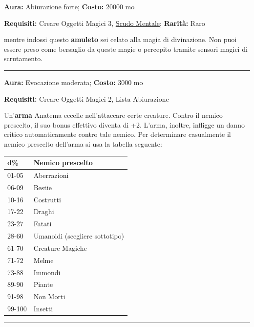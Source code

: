 \begin{multicols}{2}
\textbf{Aura:} Abiurazione forte; \textbf{Costo:} 20000 mo

\textbf{Requisiti:} Creare Oggetti Magici 3, \hyperlink{AnellodelloScudoMentale}{Scudo Mentale}; \textbf{Rarità:} Raro

mentre indossi questo \textbf{amuleto} sei celato alla magia di divinazione. Non puoi essere preso come bersaglio da queste magie o percepito tramite sensori magici di scrutamento.

\smallskip\noindent\rule{\linewidth}{2pt}  \hypertarget{armaAnatema}{}\smallskip{}\noindent\label{armaAnatema}

\textbf{Aura:} Evocazione moderata; \textbf{Costo:} 3000 mo

\textbf{Requisiti:} Creare Oggetti Magici 2, Lista Abiurazione

Un'\textbf{arma} Anatema eccelle nell'attaccare certe creature. Contro il nemico prescelto, il suo bonus effettivo diventa di +2. L'arma, inoltre, infligge un danno critico automaticamente contro tale nemico. Per determinare casualmente il nemico prescelto dell'arma si usa la tabella seguente:

\medskip

\noindent\begin{tabular}{ll}
	\toprule
d\% &Nemico prescelto\\
\toprule
01-05 &Aberrazioni\\
06-09 &Bestie\\
10-16 &Costrutti\\
17-22 &Draghi\\
23-27 &Fatati\\
28-60 &Umanoidi (scegliere sottotipo)\\
61-70 &Creature Magiche\\
71-72 &Melme\\
73-88 &Immondi\\
89-90 &Piante\\
91-98 &Non Morti\\
99-100 &Insetti
\end{tabular}

\medskip

\smallskip\noindent\rule{\linewidth}{2pt}  \hypertarget{AnelloAccumulaIncantesimi}{}\smallskip{}\noindent\label{AnelloAccumulaIncantesimi}


\end{multicols}
